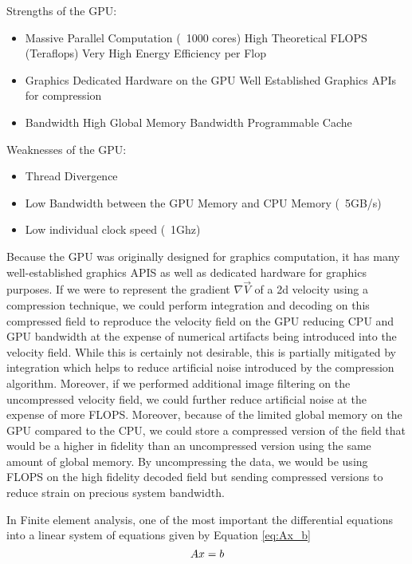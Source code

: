\documentclass[DIV=calc, paper=a4, fontsize=10pt, twocolumn]{scrartcl}	 %
\begin{document}
Strengths of the GPU:

\begin{itemize}
\item Massive Parallel Computation (~1000 cores)
	\subitem High Theoretical FLOPS (Teraflops)
	\subitem Very High Energy Efficiency per Flop
\item Graphics
	\subitem Dedicated Hardware on the GPU
	\subitem Well Established Graphics APIs for compression
\item Bandwidth
	\subitem High Global Memory Bandwidth
	\subitem Programmable Cache 
\end{itemize}

Weaknesses of the GPU:

\begin{itemize}
\item Thread Divergence
\item Low Bandwidth between the GPU Memory and CPU Memory (~5GB/s)
\item Low individual clock speed (~1Ghz)
\end{itemize}

Because the GPU was originally designed for graphics computation, it has many well-established graphics APIS as well as dedicated hardware for graphics purposes. If we were to represent the gradient 
$\nabla \vec{V}$ of a 2d velocity using a compression technique, we could perform integration and decoding on this compressed field to reproduce the velocity field on the GPU reducing CPU and GPU bandwidth at the expense of numerical artifacts being introduced into the velocity field. While this is certainly not desirable, this is partially mitigated by integration which helps to reduce artificial noise introduced by the compression algorithm. Moreover, if we performed additional image filtering on the uncompressed velocity field, we could further reduce artificial noise at the expense of more FLOPS. Moreover, because of the limited global memory on the GPU compared to the CPU, we could store a compressed version of the field that would be a higher in fidelity than an uncompressed version using the same amount of global memory. By uncompressing the data, we would be using FLOPS on the high fidelity decoded field but sending compressed versions to reduce strain on precious system bandwidth.  

In Finite element analysis, one of the most important the differential equations into a linear system of equations given by Equation \ref{eq:Ax_b}
\begin{equation} \label{eq:Ax_b}
\boldmath{A}x = b
\end{equation}
\end{document}
